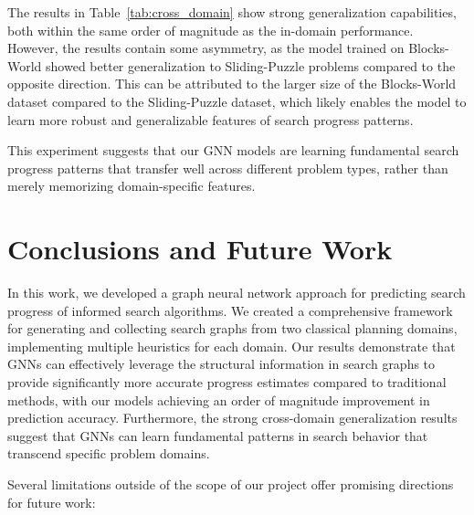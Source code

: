 \documentclass[letterpaper]{article}
\begin{document}
The results in Table~\ref{tab:cross_domain} show strong generalization capabilities, both within the same order of magnitude as the in-domain performance.
However, the results contain some asymmetry, as the model trained on Blocks-World showed better generalization to Sliding-Puzzle problems compared to the opposite direction. This can be attributed to the larger size of the Blocks-World dataset compared to the Sliding-Puzzle dataset, which likely enables the model to learn more robust and generalizable features of search progress patterns.

This experiment suggests that our GNN models are learning fundamental search progress patterns that transfer well across different problem types, rather than merely memorizing domain-specific features.

\section{Conclusions and Future Work}

In this work, we developed a graph neural network approach for predicting search progress of informed search algorithms. We created a comprehensive framework for generating and collecting search graphs from two classical planning domains, implementing multiple heuristics for each domain. Our results demonstrate that GNNs can effectively leverage the structural information in search graphs to provide significantly more accurate progress estimates compared to traditional methods, with our models achieving an order of magnitude improvement in prediction accuracy. Furthermore, the strong cross-domain generalization results suggest that GNNs can learn fundamental patterns in search behavior that transcend specific problem domains.

Several limitations outside of the scope of our project offer promising directions for future work:
\end{document}
